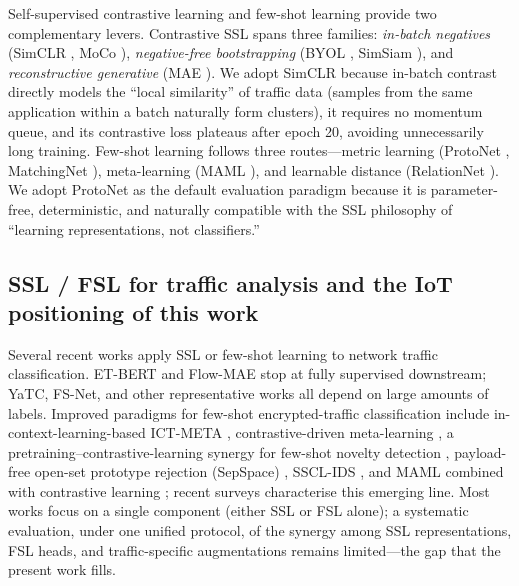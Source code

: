 \documentclass[sensors,article,submit,moreauthors]{Definitions/mdpi}
\begin{document}
Self-supervised contrastive learning \cite{lekhac2020contrastive,jing2021ssl,dong2025sslreview} and few-shot learning \cite{wang2020fsl} provide two complementary levers. Contrastive SSL spans three families: \emph{in-batch negatives} (SimCLR \cite{chen2020simclr}, MoCo \cite{he2020moco}), \emph{negative-free bootstrapping} (BYOL \cite{grill2020byol}, SimSiam \cite{chen2021simsiam}), and \emph{reconstructive generative} (MAE \cite{he2022mae}). We adopt SimCLR because in-batch contrast directly models the ``local similarity'' of traffic data (samples from the same application within a batch naturally form clusters), it requires no momentum queue, and its contrastive loss plateaus after epoch 20, avoiding unnecessarily long training. Few-shot learning follows three routes---metric learning (ProtoNet \cite{snell2017protonet}, MatchingNet \cite{vinyals2016matching}), meta-learning (MAML \cite{finn2017maml}), and learnable distance (RelationNet \cite{sung2018relationnet}). We adopt ProtoNet as the default evaluation paradigm because it is parameter-free, deterministic, and naturally compatible with the SSL philosophy of ``learning representations, not classifiers.''

\subsection{SSL / FSL for traffic analysis and the IoT positioning of this work}
\label{sec:trafficssl}

Several recent works apply SSL or few-shot learning to network traffic classification. ET-BERT \cite{lin2022etbert} and Flow-MAE \cite{hang2023flowmae} stop at fully supervised downstream; YaTC, FS-Net, and other representative works all depend on large amounts of labels. Improved paradigms for few-shot encrypted-traffic classification include in-context-learning-based ICT-META \cite{chang2026ictmeta}, contrastive-driven meta-learning \cite{li2025contrastivemeta}, a pretraining--contrastive-learning synergy for few-shot novelty detection \cite{zhao2026pretraincontrast}, payload-free open-set prototype rejection (SepSpace) \cite{qu2026sepSpace}, SSCL-IDS \cite{golchin2024ssclids}, and MAML combined with contrastive learning \cite{jin2025mamlcl}; recent surveys \cite{rahaman2026review,yang2024clidssurvey} characterise this emerging line. Most works focus on a single component (either SSL or FSL alone); a systematic evaluation, under one unified protocol, of the synergy among SSL representations, FSL heads, and traffic-specific augmentations remains limited---the gap that the present work fills.
\end{document}
